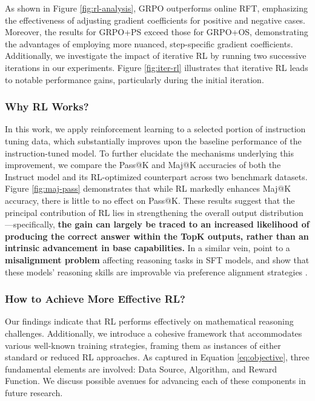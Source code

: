 \begin{itemize}[topsep=0pt]
\begin{itemize}[topsep=0pt]
As shown in Figure \ref{fig:rl-analysis}, GRPO outperforms online RFT, emphasizing the effectiveness of adjusting gradient coefficients for positive and negative cases. Moreover, the results for GRPO+PS exceed those for GRPO+OS, demonstrating the advantages of employing more nuanced, step-specific gradient coefficients. Additionally, we investigate the impact of iterative RL by running two successive iterations in our experiments. Figure \ref{fig:iter-rl} illustrates that iterative RL leads to notable performance gains, particularly during the initial iteration.

\subsubsection{Why RL Works?} In this work, we apply reinforcement learning to a selected portion of instruction tuning data, which substantially improves upon the baseline performance of the instruction-tuned model. To further elucidate the mechanisms underlying this improvement, we compare the Pass@K and Maj@K accuracies of both the Instruct model and its RL-optimized counterpart across two benchmark datasets. Figure \ref{fig:maj-pass} demonstrates that while RL markedly enhances Maj@K accuracy, there is little to no effect on Pass@K. These results suggest that the principal contribution of RL lies in strengthening the overall output distribution—specifically, \textbf{the gain can largely be traced to an increased likelihood of producing the correct answer within the TopK outputs, rather than an intrinsic advancement in base capabilities.} In a similar vein, \citep{wang2023making} point to a \textbf{misalignment problem} affecting reasoning tasks in SFT models, and show that these models' reasoning skills are improvable via preference alignment strategies \citep{yuan2023rrhf,song2023preference,wang2023making}.

\subsubsection{How to Achieve More Effective RL?}
\label{sec:effec_rl}
Our findings indicate that RL performs effectively on mathematical reasoning challenges. Additionally, we introduce a cohesive framework that accommodates various well-known training strategies, framing them as instances of either standard or reduced RL approaches. As captured in Equation \ref{eq:objective}, three fundamental elements are involved: Data Source, Algorithm, and Reward Function. We discuss possible avenues for advancing each of these components in future research.


\end{itemize}
\end{itemize}
